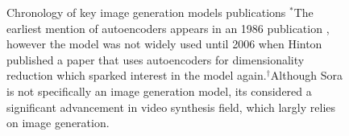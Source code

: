 \begin{figure}
    \centering
    \caption{Chronology of key image generation models publications $^*$The earliest mention of autoencoders appears in an 1986 publication \cite{autoencoder_original_paper_1986}, however the model was not widely used until 2006 when Hinton published a paper that uses autoencoders for dimensionality reduction \cite{autoencoder_2006_paper} which sparked interest in the model again.$^\dag$Although Sora \cite{sora_website} is not specifically an image generation model, its considered a significant advancement in video synthesis field, which largly relies on image generation.}
    \label{fig:timeline}
  \end{figure}